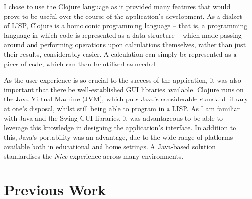 \documentclass[12pt,twoside,notitlepage,xetex]{report}
\begin{document}
I chose to use the Clojure language as it provided many features that would
prove to be useful over the course of the application's development.  As a
dialect of LISP, Clojure is a homoiconic programming language -- that is, a
programming language in which code is represented as a data structure -- which
made passing around and performing operations upon calculations themselves,
rather than just their results, considerably easier.  A calculation can simply
be represented as a piece of code, which can then be utilised as needed.

As the user experience is so crucial to the success of the application, it was
also important that there be well-established GUI libraries available.  Clojure
runs on the Java Virtual Machine (JVM), which puts Java's considerable standard
library at one's disposal, whilst still being able to program in a LISP.  As I
am familiar with Java and the Swing GUI libraries, it was advantageous to be
able to leverage this knowledge in designing the application's interface.  In
addition to this, Java's portability was an advantage, due to the wide range of
platforms available both in educational and home settings.  A Java-based
solution standardises the \emph{Nico} experience across many environments.

\section{Previous Work}
\end{document}
